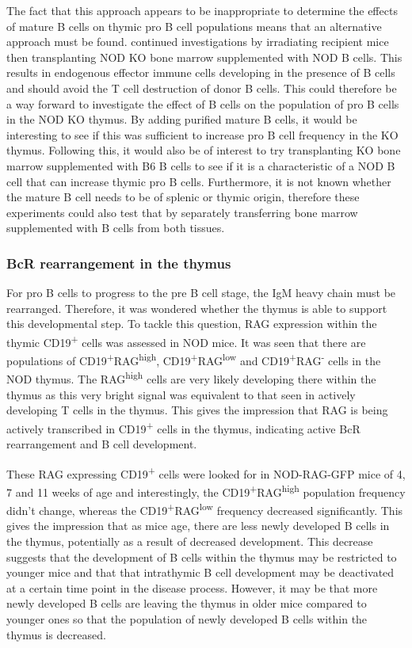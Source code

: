 The fact that this approach appears to be inappropriate to determine the effects of mature B cells on thymic pro B cell populations means that an alternative approach must be found.
\citet{Serreze1998} continued investigations by irradiating recipient mice then transplanting NOD KO bone marrow supplemented with NOD B cells.
This results in endogenous effector immune cells developing in the presence of B cells and should avoid the T cell destruction of donor B cells.
This could therefore be a way forward to investigate the effect of B cells on the population of pro B cells in the NOD KO thymus.
By adding purified mature B cells, it would be interesting to see if this was sufficient to increase pro B cell frequency in the KO thymus.
Following this, it would also be of interest to try transplanting KO bone marrow supplemented with B6 B cells to see if it is a characteristic of a NOD B cell that can increase thymic pro B cells.
Furthermore, it is not known whether the mature B cell needs to be of splenic or thymic origin, therefore these experiments could also test that by separately transferring bone marrow supplemented with B cells from both tissues.

\subsubsection{BcR rearrangement in the thymus}


For pro B cells to progress to the pre B cell stage, the IgM heavy chain must be rearranged.
Therefore, it was wondered whether the thymus is able to support this developmental step.
To tackle this question, RAG expression within the thymic CD19\textsuperscript{+} cells was assessed in NOD mice.
It was seen that there are populations of CD19\textsuperscript{+}RAG\textsuperscript{high}, CD19\textsuperscript{+}RAG\textsuperscript{low} and CD19\textsuperscript{+}RAG\textsuperscript{-} cells in the NOD thymus.
The RAG\textsuperscript{high} cells are very likely developing there within the thymus as this very bright signal was equivalent to that seen in actively developing T cells in the thymus.
This gives the impression that RAG is being actively transcribed in CD19\textsuperscript{+} cells in the thymus, indicating active BcR rearrangement and B cell development.

These RAG expressing CD19\textsuperscript{+} cells were looked for in NOD-RAG-GFP mice of 4, 7 and 11 weeks of age and interestingly, the CD19\textsuperscript{+}RAG\textsuperscript{high} population frequency didn't change, whereas the CD19\textsuperscript{+}RAG\textsuperscript{low} frequency decreased significantly.
This gives the impression that as mice age, there are less newly developed B cells in the thymus, potentially as a result of decreased development.
This decrease suggests that the development of B cells within the thymus may be restricted to younger mice and that that intrathymic B cell development may be deactivated at a certain time point in the disease process.
However, it may be that more newly developed B cells are leaving the thymus in older mice compared to younger ones so that the population of newly developed B cells within the thymus is decreased.

